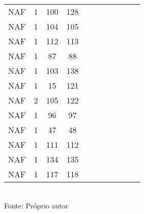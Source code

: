 \begin{table}[H]
{\begin{tabular}{ccccccccccc}
NAF & 1 & 100 & 128 &  &  &  &  &  &  &  \\
NAF & 1 & 104 & 105 &  &  &  &  &  &  &  \\
NAF & 1 & 112 & 113 &  &  &  &  &  &  &  \\
NAF & 1 & 87 & 88 &  &  &  &  &  &  &  \\
NAF & 1 & 103 & 138 &  &  &  &  &  &  &  \\
NAF & 1 & 15 & 121 &  &  &  &  &  &  &  \\
NAF & 2 & 105 & 122 &  &  &  &  &  &  &  \\
NAF & 1 & 96 & 97 &  &  &  &  &  &  &  \\
NAF & 1 & 47 & 48 &  &  &  &  &  &  &  \\
NAF & 1 & 111 & 112 &  &  &  &  &  &  &  \\
NAF & 1 & 134 & 135 &  &  &  &  &  &  &  \\
NAF & 1 & 117 & 118 &  &  &  &  &  &  &  \\
\bottomrule
\end{tabular}}
\\Fonte: Próprio autor
\end{table}


